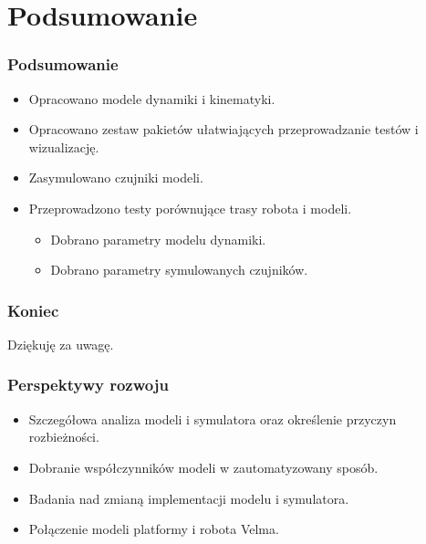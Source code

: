 \documentclass{beamer}
\begin{document}
	\section{Podsumowanie}
	\begin{frame}
		\frametitle{Podsumowanie}
		\begin{itemize}
			\item Opracowano modele dynamiki i kinematyki.
			\item Opracowano zestaw pakietów ułatwiających przeprowadzanie testów i wizualizację.
			\item Zasymulowano czujniki modeli.
			\item Przeprowadzono testy porównujące trasy robota i modeli.
			\begin{itemize}
				\item Dobrano parametry modelu dynamiki.
				\item Dobrano parametry symulowanych czujników.
			\end{itemize}
		\end{itemize}
	\end{frame}
	
	\begin{frame}
		\frametitle{Koniec}
		\centering
		Dziękuję za uwagę.\\
	\end{frame}
	
	\begin{frame}
		\frametitle{Perspektywy rozwoju}
		\begin{itemize}
			\item Szczegółowa analiza modeli i symulatora oraz określenie przyczyn rozbieżności.
			\item Dobranie współczynników modeli w zautomatyzowany sposób.
			\item Badania nad zmianą implementacji modelu i symulatora.
			\item Połączenie modeli platformy i robota Velma.
		\end{itemize}
	\end{frame}
\end{document}
